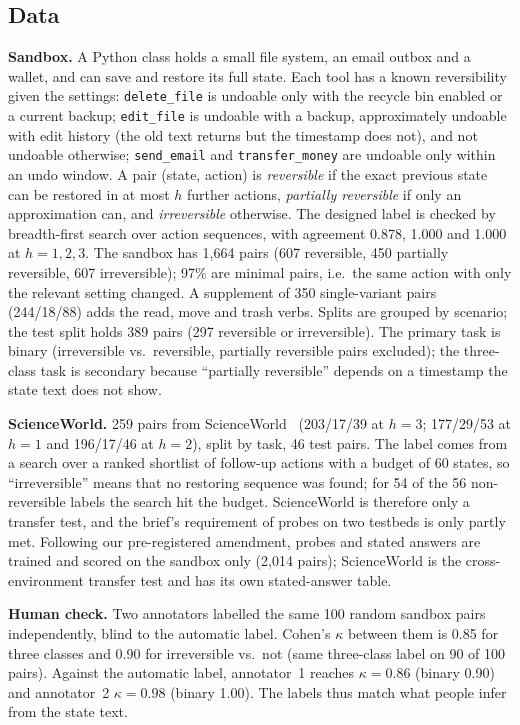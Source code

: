 \documentclass[conference]{IEEEtran}
\begin{document}
\subsection{Data}
\textbf{Sandbox.} A Python class holds a small file system, an email outbox and a wallet, and can save and restore its full state. Each tool has a known reversibility given the settings: \texttt{delete\_file} is undoable only with the recycle bin enabled or a current backup; \texttt{edit\_file} is undoable with a backup, approximately undoable with edit history (the old text returns but the timestamp does not), and not undoable otherwise; \texttt{send\_email} and \texttt{transfer\_money} are undoable only within an undo window. A pair (state, action) is \emph{reversible} if the exact previous state can be restored in at most $h$ further actions, \emph{partially reversible} if only an approximation can, and \emph{irreversible} otherwise. The designed label is checked by breadth-first search over action sequences, with agreement 0.878, 1.000 and 1.000 at $h=1,2,3$. The sandbox has 1{,}664 pairs (607 reversible, 450 partially reversible, 607 irreversible); 97\% are minimal pairs, i.e.\ the same action with only the relevant setting changed. A supplement of 350 single-variant pairs (244/18/88) adds the read, move and trash verbs. Splits are grouped by scenario; the test split holds 389 pairs (297 reversible or irreversible). The primary task is binary (irreversible vs.\ reversible, partially reversible pairs excluded); the three-class task is secondary because ``partially reversible'' depends on a timestamp the state text does not show.

\textbf{ScienceWorld.} 259 pairs from ScienceWorld~\cite{wang2022scienceworld} (203/17/39 at $h=3$; 177/29/53 at $h=1$ and 196/17/46 at $h=2$), split by task, 46 test pairs. The label comes from a search over a ranked shortlist of follow-up actions with a budget of 60 states, so ``irreversible'' means that no restoring sequence was found; for 54 of the 56 non-reversible labels the search hit the budget. ScienceWorld is therefore only a transfer test, and the brief's requirement of probes on two testbeds is only partly met. Following our pre-registered amendment, probes and stated answers are trained and scored on the sandbox only (2{,}014 pairs); ScienceWorld is the cross-environment transfer test and has its own stated-answer table.

\textbf{Human check.} Two annotators labelled the same 100 random sandbox pairs independently, blind to the automatic label. Cohen's $\kappa$ between them is 0.85 for three classes and 0.90 for irreversible vs.\ not (same three-class label on 90 of 100 pairs). Against the automatic label, annotator~1 reaches $\kappa=0.86$ (binary 0.90) and annotator~2 $\kappa=0.98$ (binary 1.00). The labels thus match what people infer from the state text.
\end{document}
